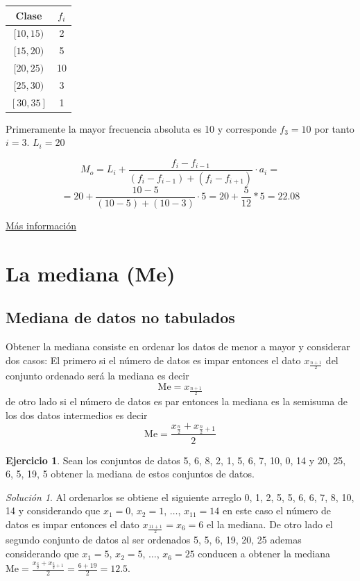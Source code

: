 \documentclass[10pt,]{krantz}
\theoremstyle{definition}
\theoremstyle{definition}
\theoremstyle{definition}
\newtheorem{exercise}{Ejercicio}[chapter]
\theoremstyle{definition}
\theoremstyle{remark}
\newtheorem*{solution}{Solución}
\begin{document}
\begin{longtable}[]{@{}cc@{}}
\toprule
Clase & \(f_i\)\tabularnewline
\midrule
\endhead
\([10,15)\) & 2\tabularnewline
\([15,20)\) & 5\tabularnewline
\([20,25)\) & 10\tabularnewline
\([25,30)\) & 3\tabularnewline
\([30,35]\) & 1\tabularnewline
\bottomrule
\end{longtable}

Primeramente la mayor frecuencia absoluta es 10 y corresponde \(f_3=10\) por tanto \(i=3\). \(L_i=20\)

\[ M_o=L_i+\frac{f_i-f_{i-1}}{(f_i-f_{i-1})+(f_i-f_{i+1})}\cdot a_i=\]
\[ =20+\frac{10-5}{(10-5)+(10-3)}\cdot 5=20+\frac{5}{12}*5=22.08\]

\href{https://www.superprof.es/apuntes/escolar/matematicas/estadistica/descriptiva/moda-estadistica.html}{Más información}

\hypertarget{la-mediana-me}{%
\section{La mediana (Me)}\label{la-mediana-me}}

\hypertarget{mediana-de-datos-no-tabulados}{%
\subsection{Mediana de datos no tabulados}\label{mediana-de-datos-no-tabulados}}

Obtener la mediana consiste en ordenar los datos de menor a mayor y considerar dos casos: El primero si el número de datos es impar entonces el dato \(x_{\frac{n+1}{2}}\) del conjunto ordenado será la mediana es decir \[\text{Me}=x_{\frac{n+1}{2}}\] de otro lado si el número de datos es par entonces la mediana es la semisuma de los dos datos intermedios es decir \[\text{Me}=\frac{x_{\frac{n}{2}}+x_{\frac{n}{2}+1}}{2}\]

\begin{exercise}
\protect\hypertarget{exr:unnamed-chunk-12}{}{\label{exr:unnamed-chunk-12} }Sean los conjuntos de datos 5, 6, 8, 2, 1, 5, 6, 7, 10, 0, 14 y 20, 25, 6, 5, 19, 5 obtener la mediana de estos conjuntos de datos.
\end{exercise}

\begin{solution}
{}Al ordenarlos se obtiene el siguiente arreglo 0, 1, 2, 5, 5, 6, 6, 7, 8, 10, 14 y considerando que \(x_1=0\), \(x_2=1\), \(\ldots\), \(x_{11}=14\) en este caso el número de datos es impar entonces el dato \(x_{\frac{11+1}{2}}=x_{6}=6\) el la mediana. De otro lado el segundo conjunto de datos al ser ordenados 5, 5, 6, 19, 20, 25 ademas considerando que \(x_1=5\), \(x_2=5\), \(\ldots\), \(x_6=25\) conducen a obtener la mediana \(\text{Me}=\frac{x_{\frac{6}{2}}+x_{\frac{6}{2}+1}}{2}=\frac{6+19}{2}=12.5\).
\end{solution}
\end{document}

